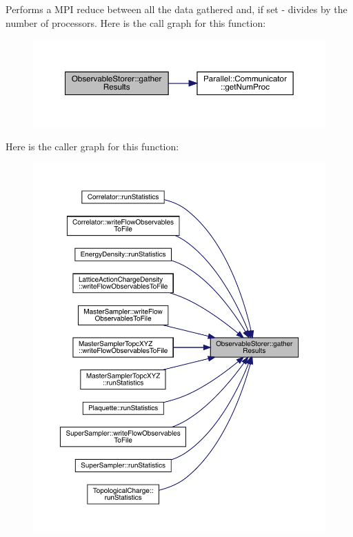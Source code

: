 Performs a M\+PI reduce between all the data gathered and, if set -\/ divides by the number of processors. Here is the call graph for this function\+:\nopagebreak
\begin{figure}[H]
\begin{center}
\leavevmode
\includegraphics[width=350pt]{class_observable_storer_a593f13b0dd0f9d20608ef6b84fda3f1d_cgraph}
\end{center}
\end{figure}
Here is the caller graph for this function\+:\nopagebreak
\begin{figure}[H]
\begin{center}
\leavevmode
\includegraphics[width=350pt]{class_observable_storer_a593f13b0dd0f9d20608ef6b84fda3f1d_icgraph}
\end{center}
\end{figure}
\mbox{\label{class_observable_storer_af03e1c58c3e0efff251ef9b65cc8d152}} 

